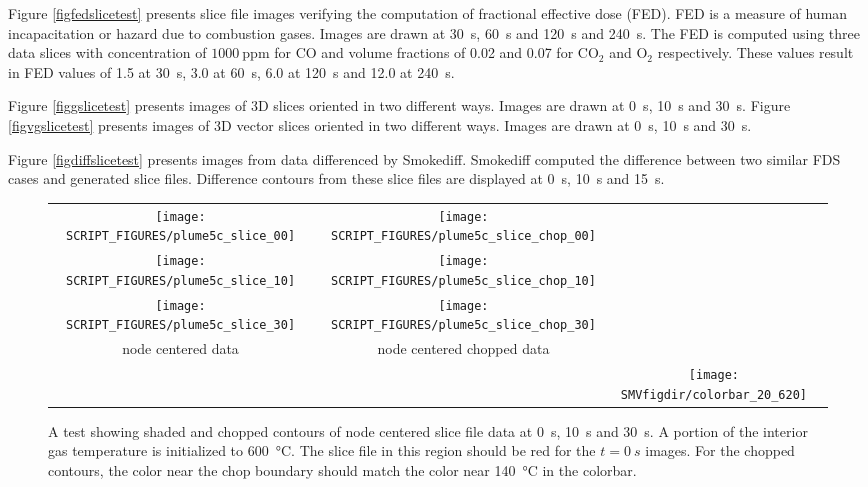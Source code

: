 \documentclass[11pt,twoside]{book}
\begin{document}
Figure \ref{figfedslicetest} presents slice file images verifying the computation
of fractional effective dose (FED).  FED is a measure of human incapacitation or
hazard due to combustion gases\cite{SFPE:Purser}. Images are drawn at \SI{30}{s},
\SI{60}{s} and \SI{120}{s} and \SI{240}{s}. The FED is computed using three data slices with concentration of $1000~\mathrm{ppm}$ for $\mathrm{CO}$ and volume fractions of 0.02 and 0.07 for $\mathrm{CO_2}$ and $\mathrm{O_2}$ respectively. These values result in FED values of 1.5 at \SI{30}{s}, 3.0 at \SI{60}{s}, 6.0 at \SI{120}{s} and 12.0 at \SI{240}{s}.

Figure \ref{figgslicetest} presents images of 3D slices oriented in two different
ways. Images are drawn at \SI{0}{s}, \SI{10}{s} and \SI{30}{s}.
Figure \ref{figvgslicetest} presents images of 3D vector slices oriented in two different
ways. Images are drawn at \SI{0}{s}, \SI{10}{s} and \SI{30}{s}.

Figure \ref{figdiffslicetest} presents images from data differenced by Smokediff.
Smokediff computed the difference between two similar FDS cases and generated slice
files. Difference contours from these slice files are displayed at \SI{0}{s},
\SI{10}{s} and \SI{15}{s}.

\begin{figure}[bph]
\begin{center}
\begin{tabular}{cccp{1.0in}}
 \texttt{[image: SCRIPT\_FIGURES/plume5c\_slice\_00]}&
 \texttt{[image: SCRIPT\_FIGURES/plume5c\_slice\_chop\_00]}\\

 \texttt{[image: SCRIPT\_FIGURES/plume5c\_slice\_10]}&
 \texttt{[image: SCRIPT\_FIGURES/plume5c\_slice\_chop\_10]}\\

 \texttt{[image: SCRIPT\_FIGURES/plume5c\_slice\_30]}&
 \texttt{[image: SCRIPT\_FIGURES/plume5c\_slice\_chop\_30]}\\

 node centered data&node centered chopped data\\
&&\raisebox{0.5in}[0pt]{\texttt{[image: \\SMVfigdir/colorbar\_20\_620]}}\\
 \end{tabular}
\end{center}
 \caption[A test showing shaded and chopped contours of node centered slice
 file data]{A test showing shaded and chopped contours of node centered slice
 file data at \SI{0}{s}, \SI{10}{s} and \SI{30}{s}.  A portion of the interior
 gas temperature is initialized to \SI{600}{\degreeCelsius}.  The slice file
 in this region should be red for the $t=\SI{0}{s}$ images.  For the chopped
 contours, the color near the chop boundary should match the color near
 \SI{140}{\degreeCelsius} in the colorbar.}
\label{fignodeslicetest}%
\end{figure}
\end{document}
